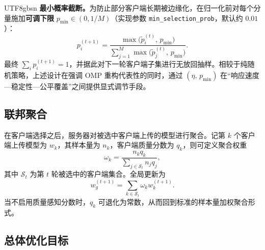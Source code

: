 \documentclass{article}
\begin{document}
\begin{CJK*}{UTF8}{gbsn}
\textbf{最小概率截断。}为防止部分客户端长期被边缘化，在归一化前对每个分量施加\textbf{可调下限} $p_{\min}\in(0,1/M)$（实现参数 \texttt{min\_selection\_prob}，默认约 $0.01$）：
\begin{equation}
p_i^{(t+1)}=\frac{\max\bigl(\tilde{p}_i^{(t)},\,p_{\min}\bigr)}{\sum_{j=1}^{M}\max\bigl(\tilde{p}_j^{(t)},\,p_{\min}\bigr)}.
\end{equation}
最终 $\sum_i p_i^{(t+1)}=1$，并据此对下一轮客户端子集进行无放回抽样。相较于纯随机策略，上述设计在强调 OMP 重构代表性的同时，通过 $(\eta,\,p_{\min})$ 在“响应速度—稳定性—公平覆盖”之间提供显式调节手段。

\subsection{联邦聚合}

在客户端选择之后，服务器对被选中客户端上传的模型进行聚合。记第 $k$ 个客户端上传模型为 $w_k$，其样本量为 $n_k$，客户端质量分数为 $q_k$，则可定义聚合权重
\begin{equation}
\omega_k = \frac{n_k q_k}{\sum_{j\in \mathcal{S}_t} n_j q_j},
\end{equation}
其中 $\mathcal{S}_t$ 为第 $t$ 轮被选中的客户端集合。全局更新为
\begin{equation}
w_g^{(t+1)} = \sum_{k\in \mathcal{S}_t} \omega_k w_k^{(t+1)}.
\end{equation}
当不启用质量感知分数时，$q_k$ 可退化为常数，从而回到标准的样本量加权聚合形式。

\subsection{总体优化目标}


\end{CJK*}
\end{document}
